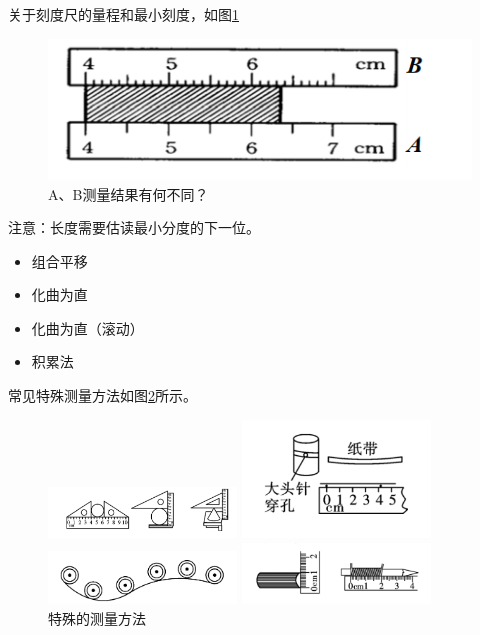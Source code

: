 \documentclass[windows,csize4]{BHCexam}
\begin{document}
\begin{groups}
    关于刻度尺的量程和最小刻度，如图\ref{fig:fig_1_5}
    \begin{figure}[htb]
        \centering
        \includegraphics [scale=0.75,trim=0 0 0 0]{./image/fig_1_5.PNG}
        \caption{A、B测量结果有何不同？} 
        \label{fig:fig_1_5}
    \end{figure}

    注意：长度需要估读最小分度的下一位。

\begin{itemize}
    \item 组合平移
    \item 化曲为直
    \item 化曲为直（滚动）
    \item 积累法
\end{itemize}
常见特殊测量方法如图\ref{fig:fig_1_7_10}所示。
\begin{figure}
    \centering
    \begin{minipage}{5cm}
        \includegraphics[width=5cm]{./image/fig_1_7.PNG}
    \end{minipage}
    \begin{minipage}{5cm}
        \includegraphics[width=5cm]{./image/fig_1_8.PNG}
    \end{minipage}


    \begin{minipage}{5cm}
        \includegraphics[width=5cm]{./image/fig_1_9.PNG}
    \end{minipage}
    \begin{minipage}{5cm}
        \includegraphics[width=5cm]{./image/fig_1_10.PNG}
    \end{minipage}   
\caption{特殊的测量方法} 
\label{fig:fig_1_7_10}
\end{figure}



\end{groups}
\end{document}
